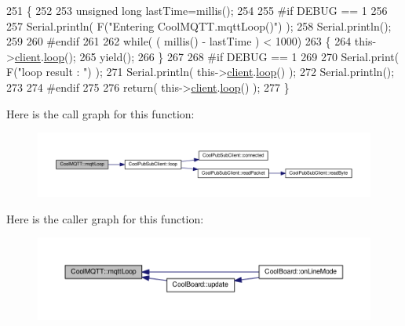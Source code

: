 \begin{DoxyCode}
251 \{
252 
253     \textcolor{keywordtype}{unsigned} \textcolor{keywordtype}{long} lastTime=millis();
254 
255 \textcolor{preprocessor}{#if DEBUG == 1}
256 
257     Serial.println( F(\textcolor{stringliteral}{"Entering CoolMQTT.mqttLoop()"}) );
258     Serial.println();
259 
260 \textcolor{preprocessor}{#endif  }
261 
262     \textcolor{keywordflow}{while}( ( millis() - lastTime ) < 1000)
263     \{
264         this->\hyperlink{class_cool_m_q_t_t_afed1372683c44893b4668d0f1771f514}{client}.\hyperlink{class_cool_pub_sub_client_afc15900f0fc4886a19394508e61793b8}{loop}();
265         yield();
266     \}
267 
268 \textcolor{preprocessor}{#if DEBUG == 1 }
269     
270     Serial.print( F(\textcolor{stringliteral}{"loop result : "}) );
271     Serial.println( this->\hyperlink{class_cool_m_q_t_t_afed1372683c44893b4668d0f1771f514}{client}.\hyperlink{class_cool_pub_sub_client_afc15900f0fc4886a19394508e61793b8}{loop}() );
272     Serial.println();
273 
274 \textcolor{preprocessor}{#endif}
275 
276     \textcolor{keywordflow}{return}( this->\hyperlink{class_cool_m_q_t_t_afed1372683c44893b4668d0f1771f514}{client}.\hyperlink{class_cool_pub_sub_client_afc15900f0fc4886a19394508e61793b8}{loop}() );
277 \}
\end{DoxyCode}
Here is the call graph for this function\+:\nopagebreak
\begin{figure}[H]
\begin{center}
\leavevmode
\includegraphics[width=350pt]{d0/dd0/class_cool_m_q_t_t_aa5eaae967b562b62cbcf2b8d81f6e5d5_cgraph}
\end{center}
\end{figure}
Here is the caller graph for this function\+:\nopagebreak
\begin{figure}[H]
\begin{center}
\leavevmode
\includegraphics[width=350pt]{d0/dd0/class_cool_m_q_t_t_aa5eaae967b562b62cbcf2b8d81f6e5d5_icgraph}
\end{center}
\end{figure}
\mbox{\label{class_cool_m_q_t_t_a40553a0ad4b5ecf1cb4411ab54ca85fb}} 
